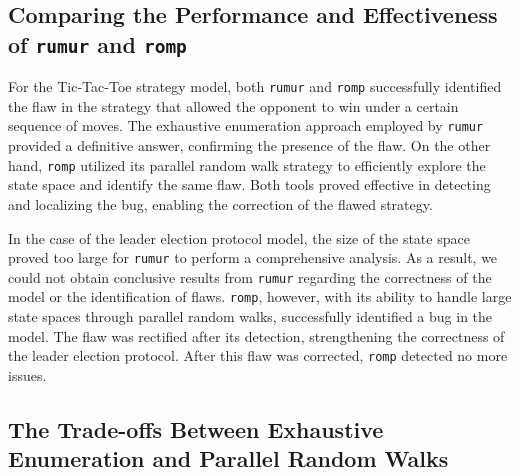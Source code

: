 
\subsection{Comparing the Performance and Effectiveness of \texttt{rumur} and \texttt{romp}}\label{subsec:comparing-the-performance-and-effectiveness-of-rumur-and-romp}

For the Tic-Tac-Toe strategy model, both \texttt{rumur} and \texttt{romp}
successfully identified the flaw in the strategy that allowed the opponent to
win under a certain sequence of moves.
The exhaustive enumeration approach employed by \texttt{rumur} provided a
definitive answer, confirming the presence of the flaw.
On the other hand, \texttt{romp} utilized its parallel random walk strategy
to efficiently explore the state space and identify the same flaw.
Both tools proved effective in detecting and localizing the bug, enabling the
correction of the flawed strategy.

In the case of the leader election protocol model, the size of the state
space proved too large for \texttt{rumur} to perform a comprehensive analysis.
As a result, we could not obtain conclusive results from \texttt{rumur}
regarding the correctness of the model or the identification of flaws.
\texttt{romp}, however, with its ability to handle large state spaces through
parallel random walks, successfully identified a bug in the model.
The flaw was rectified after its detection, strengthening the correctness of
the leader election protocol.
After this flaw was corrected, \texttt{romp} detected no more issues.

\subsection{The Trade-offs Between Exhaustive Enumeration and Parallel Random Walks}\label{subsec:the-trade-offs-between-exhaustive-enumeration-and-parallel-random-walks}

